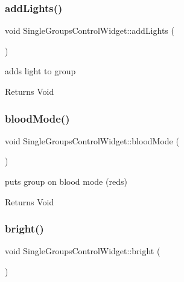 \subsubsection{\texorpdfstring{add\+Lights()}{addLights()}}
{\footnotesize\ttfamily void Single\+Groups\+Control\+Widget\+::add\+Lights (\begin{DoxyParamCaption}{ }\end{DoxyParamCaption})\hspace{0.3cm}{\ttfamily [private]}}



adds light to group 

\begin{DoxyReturn}{Returns}
Void 
\end{DoxyReturn}
\mbox{\label{class_single_groups_control_widget_a88810651632c7525970a816bdaa47d09}} 
\subsubsection{\texorpdfstring{blood\+Mode()}{bloodMode()}}
{\footnotesize\ttfamily void Single\+Groups\+Control\+Widget\+::blood\+Mode (\begin{DoxyParamCaption}{ }\end{DoxyParamCaption})\hspace{0.3cm}{\ttfamily [private]}}



puts group on blood mode (reds) 

\begin{DoxyReturn}{Returns}
Void 
\end{DoxyReturn}
\mbox{\label{class_single_groups_control_widget_abb243f17f45cd2f2d86147764f660b3e}} 
\subsubsection{\texorpdfstring{bright()}{bright()}}
{\footnotesize\ttfamily void Single\+Groups\+Control\+Widget\+::bright (\begin{DoxyParamCaption}{ }\end{DoxyParamCaption})\hspace{0.3cm}{\ttfamily [private]}}



